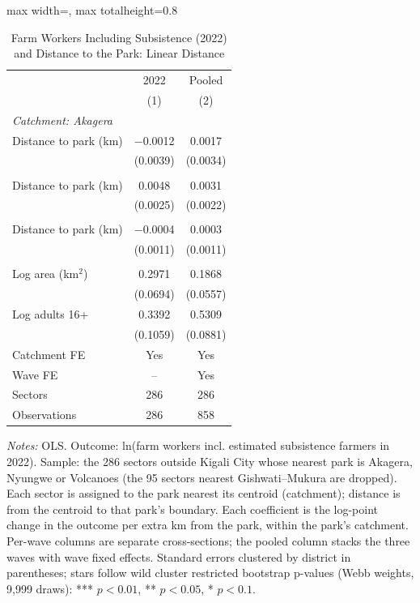 \documentclass[11pt]{article}
\begin{document}
\begin{table}[H]
\centering\footnotesize\setlength{\tabcolsep}{4pt}
\caption{Farm Workers Including Subsistence (2022) and Distance to the Park: Linear Distance}
\label{tab:main_linear_ln_farm_sub}
\begin{adjustbox}{max width=\textwidth, max totalheight=0.8\textheight}
\begin{tabular}{lcc}
\toprule
 & 2022 & Pooled \\
 & (1) & (2) \\
\midrule
\multicolumn{3}{l}{\textit{Catchment: Akagera}} \\
\quad Distance to park (km) & $-$0.0012 & 0.0017 \\
 & (0.0039) & (0.0034) \\
\addlinespace
\multicolumn{3}{l}{\textit{Catchment: Nyungwe}} \\
\quad Distance to park (km) & 0.0048 & 0.0031 \\
 & (0.0025) & (0.0022) \\
\addlinespace
\multicolumn{3}{l}{\textit{Catchment: Volcanoes}} \\
\quad Distance to park (km) & $-$0.0004 & 0.0003 \\
 & (0.0011) & (0.0011) \\
\addlinespace
\multicolumn{3}{l}{\textit{Controls}} \\
\quad Log area (km$^2$) & 0.2971 & 0.1868 \\
 & (0.0694) & (0.0557) \\
\quad Log adults 16+ & 0.3392 & 0.5309 \\
 & (0.1059) & (0.0881) \\
\midrule
Catchment FE & Yes & Yes \\
Wave FE & -- & Yes \\
Sectors & 286 & 286 \\
Observations & 286 & 858 \\
\bottomrule
\end{tabular}
\end{adjustbox}
\begin{minipage}{0.97\textwidth}\scriptsize
\textit{Notes:} OLS. Outcome: ln(farm workers incl. estimated subsistence farmers in 2022). Sample: the 286 sectors outside Kigali City whose nearest park is Akagera, Nyungwe or Volcanoes (the 95 sectors nearest Gishwati--Mukura are dropped). Each sector is assigned to the park nearest its centroid (catchment); distance is from the centroid to that park's boundary. Each coefficient is the log-point change in the outcome per extra km from the park, within the park's catchment. Per-wave columns are separate cross-sections; the pooled column stacks the three waves with wave fixed effects. Standard errors clustered by district in parentheses; stars follow wild cluster restricted bootstrap p-values (Webb weights, 9,999 draws): *** $p<0.01$, ** $p<0.05$, * $p<0.1$.
\end{minipage}
\end{table}
\end{document}
